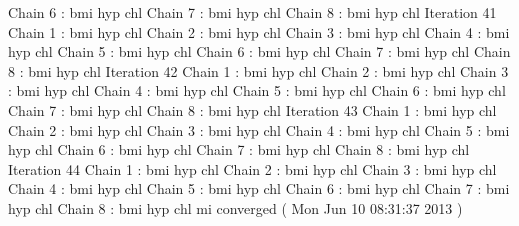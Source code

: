 \begin{Schunk}
\begin{Soutput}
 Chain 6 : bmi   hyp   chl   
 Chain 7 : bmi   hyp   chl   
 Chain 8 : bmi   hyp   chl   
Iteration 41 
 Chain 1 : bmi   hyp   chl   
 Chain 2 : bmi   hyp   chl   
 Chain 3 : bmi   hyp   chl   
 Chain 4 : bmi   hyp   chl   
 Chain 5 : bmi   hyp   chl   
 Chain 6 : bmi   hyp   chl   
 Chain 7 : bmi   hyp   chl   
 Chain 8 : bmi   hyp   chl   
Iteration 42 
 Chain 1 : bmi   hyp   chl   
 Chain 2 : bmi   hyp   chl   
 Chain 3 : bmi   hyp   chl   
 Chain 4 : bmi   hyp   chl   
 Chain 5 : bmi   hyp   chl   
 Chain 6 : bmi   hyp   chl   
 Chain 7 : bmi   hyp   chl   
 Chain 8 : bmi   hyp   chl   
Iteration 43 
 Chain 1 : bmi   hyp   chl   
 Chain 2 : bmi   hyp   chl   
 Chain 3 : bmi   hyp   chl   
 Chain 4 : bmi   hyp   chl   
 Chain 5 : bmi   hyp   chl   
 Chain 6 : bmi   hyp   chl   
 Chain 7 : bmi   hyp   chl   
 Chain 8 : bmi   hyp   chl   
Iteration 44 
 Chain 1 : bmi   hyp   chl   
 Chain 2 : bmi   hyp   chl   
 Chain 3 : bmi   hyp   chl   
 Chain 4 : bmi   hyp   chl   
 Chain 5 : bmi   hyp   chl   
 Chain 6 : bmi   hyp   chl   
 Chain 7 : bmi   hyp   chl   
 Chain 8 : bmi   hyp   chl   
mi converged ( Mon Jun 10 08:31:37 2013 )
\end{Soutput}
\end{Schunk}
